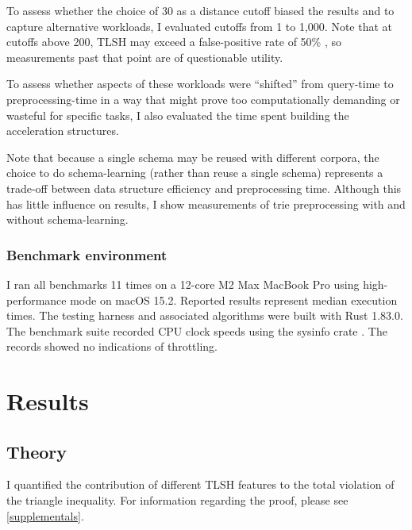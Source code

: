 \documentclass[5p,final]{elsarticle}
\begin{document}
To assess whether the choice of $30$ as a
distance cutoff biased the results and to capture alternative
workloads, I evaluated cutoffs from 1 to 1,000. Note
that at cutoffs above 200, TLSH may exceed a false-positive rate of 50\%
\cite{oliverTLSHLocalitySensitive2013}, so measurements past that
point are of questionable utility.

To assess whether aspects of these workloads were \enquote{shifted}
from query-time to preprocessing-time in a way that might prove too
computationally demanding or wasteful for specific tasks, I also
evaluated the time spent building the acceleration structures.

Note that because a single schema may be reused with different
corpora, the choice to do schema-learning (rather than reuse a
single schema) represents a trade-off between data structure
efficiency and preprocessing time. Although this has little influence
on results, I show measurements of trie preprocessing with and
without schema-learning.

\subsubsection{Benchmark environment}

I ran all benchmarks 11 times on a 12-core M2 Max MacBook Pro using
high-performance mode on macOS 15.2. Reported results represent
median execution times. The testing harness and associated algorithms
were built with Rust 1.83.0. The benchmark suite recorded CPU clock
speeds using the sysinfo crate \cite{SysinfoCratesioRust2024}.
The records showed no indications of throttling.

\section{Results}

\subsection{Theory}
I quantified the contribution of different TLSH features to the
total violation of the triangle inequality.
For information regarding the proof, please see \ref{supplementals}.

\vspace*{-0.5\baselineskip}
\end{document}
